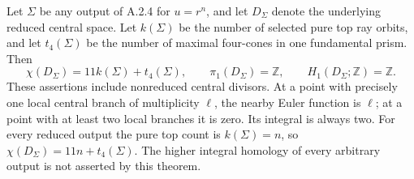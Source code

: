 \begin{theorem}\label{push:src:A.4.7}\label{push:A47}
Let $\Sigma$ be any output of A.2.4 for $u=r^n$, and let
$D_\Sigma$ denote the underlying reduced central space.
Let $k(\Sigma)$ be the number of selected pure top ray
orbits, and let $t_4(\Sigma)$ be the number of maximal
four-cones in one fundamental prism. Then
\[
 \chi(D_\Sigma)=11k(\Sigma)+t_4(\Sigma),
 \qquad \pi_1(D_\Sigma)=\mathbb Z,
 \qquad H_1(D_\Sigma;\mathbb Z)=\mathbb Z.
\]
These assertions include nonreduced central divisors.
At a point with precisely one local central branch of
multiplicity $\ell$, the nearby Euler function is $\ell$;
at a point with at least two local branches it is zero.
Its integral is always two. For every reduced output the
pure top count is $k(\Sigma)=n$, so
$\chi(D_\Sigma)=11n+t_4(\Sigma)$.
The higher integral homology of every arbitrary output is
not asserted by this theorem.
\end{theorem}
